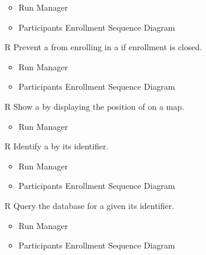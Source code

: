 \begin{itemize}
	\begin{itemize}
		\item Run Manager
		\item Participants Enrollment Sequence Diagram
	\end{itemize}
	\item[R\subs{47}]Prevent a  from enrolling in a  if enrollment is closed.
	\begin{itemize}
		\item Run Manager
		\item Participants Enrollment Sequence Diagram
	\end{itemize}
	\item[R\subs{48}]Show a  by displaying the position of  on a map.
	\begin{itemize}
		\item Run Manager
	\end{itemize}
	\item[R\subs{49}]Identify a  by its identifier.
	\begin{itemize}
		\item Run Manager
		\item Participants Enrollment Sequence Diagram
	\end{itemize}
	\item[R\subs{50}]Query the database for a  given its identifier.
	\begin{itemize}
		\item Run Manager
		\item Participants Enrollment Sequence Diagram
	\end{itemize}
\end{itemize}


\thispagestyle{fancy}

